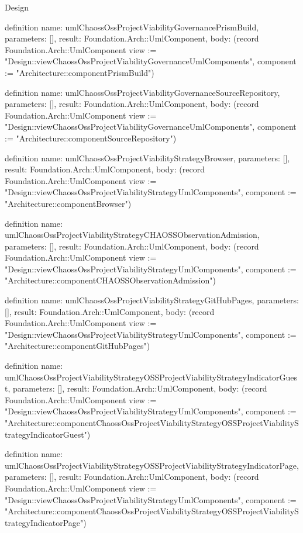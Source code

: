 \begin{lexlean}{Design}
\begin{semanticmodule}
definition{
  name: umlChaossOssProjectViabilityGovernancePrismBuild,
  parameters: [],
  result: Foundation.Arch::UmlComponent,
  body: (record Foundation.Arch::UmlComponent {view := "Design::viewChaossOssProjectViabilityGovernanceUmlComponents", component := "Architecture::componentPrismBuild"})
}

definition{
  name: umlChaossOssProjectViabilityGovernanceSourceRepository,
  parameters: [],
  result: Foundation.Arch::UmlComponent,
  body: (record Foundation.Arch::UmlComponent {view := "Design::viewChaossOssProjectViabilityGovernanceUmlComponents", component := "Architecture::componentSourceRepository"})
}

definition{
  name: umlChaossOssProjectViabilityStrategyBrowser,
  parameters: [],
  result: Foundation.Arch::UmlComponent,
  body: (record Foundation.Arch::UmlComponent {view := "Design::viewChaossOssProjectViabilityStrategyUmlComponents", component := "Architecture::componentBrowser"})
}

definition{
  name: umlChaossOssProjectViabilityStrategyCHAOSSObservationAdmission,
  parameters: [],
  result: Foundation.Arch::UmlComponent,
  body: (record Foundation.Arch::UmlComponent {view := "Design::viewChaossOssProjectViabilityStrategyUmlComponents", component := "Architecture::componentCHAOSSObservationAdmission"})
}

definition{
  name: umlChaossOssProjectViabilityStrategyGitHubPages,
  parameters: [],
  result: Foundation.Arch::UmlComponent,
  body: (record Foundation.Arch::UmlComponent {view := "Design::viewChaossOssProjectViabilityStrategyUmlComponents", component := "Architecture::componentGitHubPages"})
}

definition{
  name: umlChaossOssProjectViabilityStrategyOSSProjectViabilityStrategyIndicatorGuest,
  parameters: [],
  result: Foundation.Arch::UmlComponent,
  body: (record Foundation.Arch::UmlComponent {view := "Design::viewChaossOssProjectViabilityStrategyUmlComponents", component := "Architecture::componentChaossOssProjectViabilityStrategyOSSProjectViabilityStrategyIndicatorGuest"})
}

definition{
  name: umlChaossOssProjectViabilityStrategyOSSProjectViabilityStrategyIndicatorPage,
  parameters: [],
  result: Foundation.Arch::UmlComponent,
  body: (record Foundation.Arch::UmlComponent {view := "Design::viewChaossOssProjectViabilityStrategyUmlComponents", component := "Architecture::componentChaossOssProjectViabilityStrategyOSSProjectViabilityStrategyIndicatorPage"})
}


\end{semanticmodule}
\end{lexlean}
